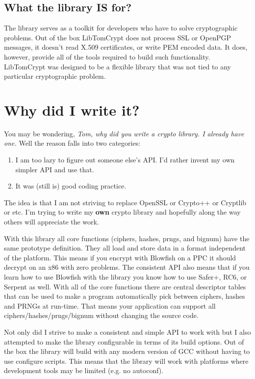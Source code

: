 \documentclass[synpaper]{book}
\newcommand{\mysection}[1]    %
	{                   %
	\section{#1}
   \markboth{\textsf{www.libtom.org}}{\thesection ~ {#1}}
	}
\begin{document}
\subsection{What the library IS for?}

The library serves as a toolkit for developers who have to solve cryptographic problems.  Out of the box LibTomCrypt
does not process SSL or OpenPGP messages, it doesn't read X.509 certificates, or write PEM encoded data.  It does, however,
provide all of the tools required to build such functionality.  LibTomCrypt was designed to be a flexible library that 
was not tied to any particular cryptographic problem.  

\mysection{Why did I write it?}
You may be wondering, \textit{Tom, why did you write a crypto library.  I already have one.}  Well the reason falls into
two categories:
\begin{enumerate}
    \item I am too lazy to figure out someone else's API.  I'd rather invent my own simpler API and use that.
    \item It was (still is) good coding practice.
\end{enumerate}

The idea is that I am not striving to replace OpenSSL or Crypto++ or Cryptlib or etc.  I'm trying to write my 
{\bf own} crypto library and hopefully along the way others will appreciate the work.

With this library all core functions (ciphers, hashes, prngs, and bignum) have the same prototype definition.  They all load
and store data in a format independent of the platform.  This means if you encrypt with Blowfish on a PPC it should decrypt
on an x86 with zero problems.  The consistent API also means that if you learn how to use Blowfish with the library you 
know how to use Safer+, RC6, or Serpent as well.  With all of the core functions there are central descriptor tables 
that can be used to make a program automatically pick between ciphers, hashes and PRNGs at run-time.  That means your 
application can support all ciphers/hashes/prngs/bignum without changing the source code.

Not only did I strive to make a consistent and simple API to work with but I also attempted to make the library
configurable in terms of its build options.  Out of the box the library will build with any modern version of GCC
without having to use configure scripts.  This means that the library will work with platforms where development
tools may be limited (e.g. no autoconf).
\end{document}
